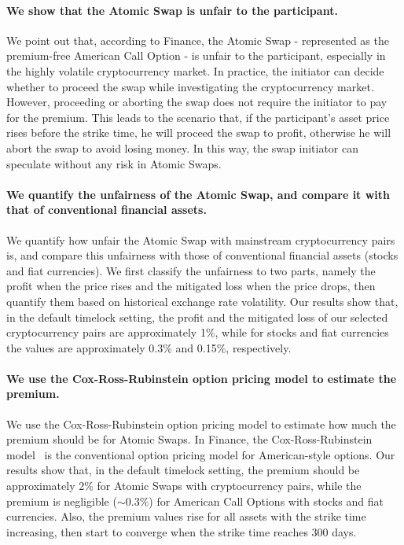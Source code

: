 \paragraph{We show that the Atomic Swap is unfair to the participant.}
We point out that, according to Finance, the Atomic Swap - represented as the premium-free American Call Option - is unfair to the participant, especially in the highly volatile cryptocurrency market.
In practice, the initiator can decide whether to proceed the swap while investigating the cryptocurrency market.
However, proceeding or aborting the swap does not require the initiator to pay for the premium.
This leads to the scenario that, if the participant's asset price rises before the strike time, he will proceed the swap to profit, otherwise he will abort the swap to avoid losing money.
In this way, the swap initiator can speculate without any risk in Atomic Swaps.

\paragraph{We quantify the unfairness of the Atomic Swap, and compare it with that of conventional financial assets.}
We quantify how unfair the Atomic Swap with mainstream cryptocurrency pairs is, and compare this unfairness with those of conventional financial assets (stocks and fiat currencies).
We first classify the unfairness to two parts, namely the profit when the price rises and the mitigated loss when the price drops, then quantify them based on historical exchange rate volatility.
Our results show that, in the default timelock setting, the profit and the mitigated loss of our selected cryptocurrency pairs are approximately 1\%, while for stocks and fiat currencies the values are approximately 0.3\% and 0.15\%, respectively.

\paragraph{We use the Cox-Ross-Rubinstein option pricing model to estimate the premium.}
We use the Cox-Ross-Rubinstein option pricing model to estimate how much the premium should be for Atomic Swaps.
In Finance, the Cox-Ross-Rubinstein model~\cite{cox1979option} is the conventional option pricing model for American-style options.
Our results show that, in the default timelock setting, the premium should be approximately 2\% for Atomic Swaps with cryptocurrency pairs, while the premium is negligible ($\sim 0.3\%$) for American Call Options with stocks and fiat currencies.
Also, the premium values rise for all assets with the strike time increasing, then start to converge when the strike time reaches 300 days.

